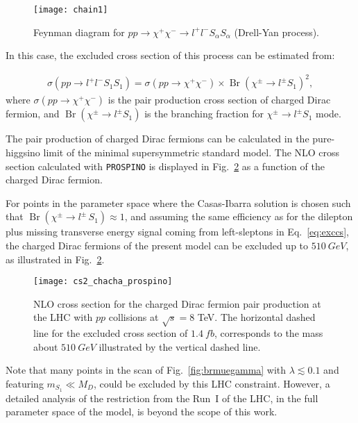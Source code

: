 \begin{figure}[h]
\begin{center}
\texttt{[image: chain1]}
\caption{Feynman diagram for $pp \rightarrow \chi^+\chi^- \rightarrow l^+l^- S_{\alpha}S_{\alpha}$ (Drell-Yan process).}
\label{fig:chain_signal}
\end{center}
\end{figure}

In this case, the excluded cross section of this process can be estimated from:

\begin{align}
\label{eq:exccs}
\sigma(pp \rightarrow l^+l^-S_1 S_1)=\sigma(pp \rightarrow \chi^+\chi^-)\times \operatorname{Br}(\chi^{\pm} \rightarrow l^{\pm}S_1)^2 ,
\end{align}
where $\sigma(pp \rightarrow \chi^+\chi^-)$ is the pair production
cross section of charged Dirac fermion, and
$\operatorname{Br}(\chi^{\pm} \rightarrow l^{\pm}S_1)$ is the
branching fraction for $\chi^{\pm} \rightarrow l^{\pm}S_1$
mode.

The pair production of charged Dirac fermions can be
calculated in the pure-higgsino limit of the minimal supersymmetric
standard model. 
The NLO cross section calculated with \texttt{PROSPINO} is displayed
in Fig.~\ref{fig:chargino_production} as a function of the charged
Dirac fermion.

For points in the parameter space where the Casas-Ibarra solution is
chosen such that $\operatorname{Br}(\chi^\pm\to l^\pm\,S_1)\approx 1$,
and assuming the same efficiency as for the dilepton plus missing
transverse energy signal coming from left-sleptons in
Eq.~\eqref{eq:exccs}, the charged Dirac fermions of the present model
can be excluded up to $\SI{510}{GeV}$, as illustrated in
Fig.~\ref{fig:chargino_production}.

\begin{figure}[h]
\begin{center}
\texttt{[image: cs2\_chacha\_prospino]}
\caption{NLO cross section for the charged Dirac fermion pair
  production at the LHC with $pp$ collisions at $\sqrt{s}=8$ TeV. 
  The horizontal dashed line for the excluded cross section of
  $\SI{1.4}{fb}$, corresponds to the mass about $\SI{510}{GeV}$
  illustrated by the vertical dashed line.}
\label{fig:chargino_production}
\end{center}
\end{figure}

Note that many points in the scan of Fig.~\ref{fig:brmuegamma} with
$\lambda\lesssim 0.1$ and featuring $m_{S_1}\ll M_D$, could be
excluded by this LHC constraint. 
However, a detailed analysis of the restriction from the Run~I of the
LHC, in the full parameter space of the model, is beyond the scope of this
work.












